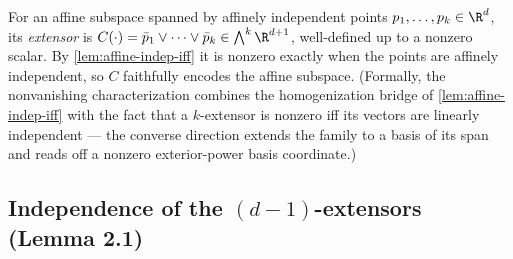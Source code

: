 \begin{definition}
  \label{def:affine-subspace-extensor}
  \leanok
  For an affine subspace spanned by affinely independent points
  $p_1, \dots, p_k \in \R^{d}$, its \emph{extensor} is
  $C(\cdot) = \bar p_1 \vee \cdots \vee \bar p_k \in \bigwedge^{k} \R^{d+1}$,
  well-defined up to a nonzero scalar. By \cref{lem:affine-indep-iff} it
  is nonzero exactly when the points are affinely independent, so $C$
  faithfully encodes the affine subspace. (Formally, the nonvanishing
  characterization combines the homogenization bridge of
  \cref{lem:affine-indep-iff} with the fact that a $k$-extensor is nonzero
  iff its vectors are linearly independent --- the converse direction
  extends the family to a basis of its span and reads off a nonzero
  exterior-power basis coordinate.)
\end{definition}

\subsection{Independence of the $(d-1)$-extensors (Lemma 2.1)}
\label{sec:molecular-lemma21}


